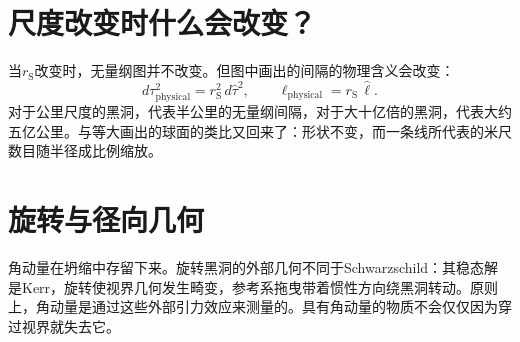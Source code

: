 \section{尺度改变时什么会改变？}

当\(r_{\mathrm S}\)改变时，无量纲图并不改变。但图中画出的间隔的物理含义会改变：
\begin{equation}
d\tau_{\mathrm{physical}}^2
=
r_{\mathrm S}^2\,d\hat{\tau}^2,
\qquad
\ell_{\mathrm{physical}}
=
r_{\mathrm S}\,\hat{\ell}.
\label{eq:l7-scale-restoration}
\end{equation}
对于公里尺度的黑洞，代表半公里的无量纲间隔，对于大十亿倍的黑洞，代表大约五亿公里。与等大画出的球面的类比又回来了：形状不变，而一条线所代表的米尺数目随半径成比例缩放。

\begin{classroomqa}
\end{classroomqa}

\begin{classroomqa}
\end{classroomqa}

\begin{classroomqa}
\end{classroomqa}

\section{旋转与径向几何}

角动量在坍缩中存留下来。旋转黑洞的外部几何不同于Schwarzschild：其稳态解是Kerr，旋转使视界几何发生畸变，参考系拖曳带着惯性方向绕黑洞转动。原则上，角动量是通过这些外部引力效应来测量的。具有角动量的物质不会仅仅因为穿过视界就失去它。

